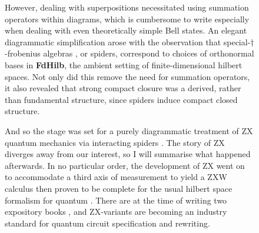 \begin{figure}[h!]
\centering
{}
\caption{However, dealing with superpositions necessitated using summation operators within diagrams, which is cumbersome to write especially when dealing with even theoretically simple Bell states. An elegant diagrammatic simplification arose with the observation that special-$\dagger$-frobenius algebras \citep{coeckeClassicalQuantumStructuralism2009}, or spiders, correspond to choices of orthonormal bases \citep{coeckeNewDescriptionOrthogonal2013c} in \textbf{FdHilb}, the ambient setting of finite-dimensional hilbert spaces. Not only did this remove the need for summation operators, it also revealed that strong compact closure was a derived, rather than fundamental structure, since spiders induce compact closed structure.}
\end{figure}

\begin{figure}[h!]
\centering
{}
\caption{And so the stage was set for a purely diagrammatic treatment of ZX quantum mechanics via interacting spiders \citep{coeckeInteractingQuantumObservables2011}. The story of ZX diverges away from our interest, so I will summarise what happened afterwards. In no particular order, the development of ZX went on to accommodate a third axis of measurement \citep{coeckeThreeQubitEntanglement2011,dewittZXcalculusIncompleteQuantum2014} to yield a ZXW calculus then proven to be complete for the usual hilbert space formalism for quantum \citep{hadzihasanovicAlgebraEntanglementGeometry2017a,ngCompletenessZWZX2018,poorCompletenessArbitraryFinite2023}. There are at the time of writing two expository books \citep{coeckePicturingQuantumProcesses2017a,coeckeQuantumPicturesNew2023}, and ZX-variants are becoming an industry standard for quantum circuit specification and rewriting.}
\end{figure}
\clearpage

